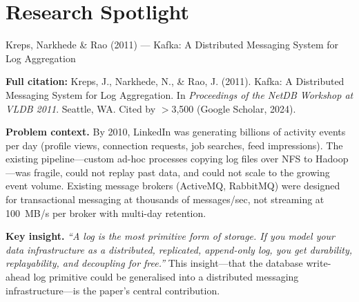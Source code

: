 \section{Research Spotlight}
\label{sec:ch8-research}

\begin{researchspotlight}{Kreps, Narkhede \& Rao (2011) --- Kafka: A
Distributed Messaging System for Log Aggregation}

\textbf{Full citation:} Kreps, J., Narkhede, N., \& Rao, J. (2011).
Kafka: A Distributed Messaging System for Log Aggregation. In
\textit{Proceedings of the NetDB Workshop at VLDB 2011}. Seattle, WA.
Cited by $>$3{,}500 (Google Scholar, 2024).

\medskip
\textbf{Problem context.} By 2010, LinkedIn was generating billions of
activity events per day (profile views, connection requests, job searches,
feed impressions). The existing pipeline---custom ad-hoc processes copying
log files over NFS to Hadoop---was fragile, could not replay past data,
and could not scale to the growing event volume. Existing message brokers
(ActiveMQ, RabbitMQ) were designed for transactional messaging at thousands
of messages/sec, not streaming at 100~MB/s per broker with multi-day retention.

\medskip
\textbf{Key insight.} \textit{``A log is the most primitive form of storage.
If you model your data infrastructure as a distributed, replicated,
append-only log, you get durability, replayability, and decoupling for free.''}
This insight---that the database write-ahead log primitive could be
generalised into a distributed messaging infrastructure---is the paper's
central contribution.


\end{researchspotlight}
